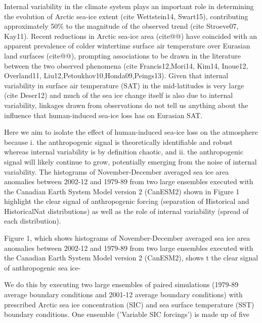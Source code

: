 \documentclass[grl]{AGUTeX}  %
\begin{document}
\begin{article}

%
%



Internal variability in the climate system plays an important role in determining the evolution of Arctic sea-ice extent (cite Wettstein14, Swart15), contributing approximately 50\% to the magnitude of the observed trend (cite Stroeve07, Kay11). Recent reductions in Arctic sea-ice area (cite@@) have coincided with an apparent prevalence of colder wintertime surface air temperature over Eurasian land surfaces (cite@@), prompting associations to be drawn in the literature between the two observed phenomena (cite Francis12,Mori14, Kim14, Inoue12, Overland11, Liu12,Petoukhov10,Honda09,Peings13). Given that internal variability in surface air temperature (SAT) in the mid-latitudes is very large (cite Deser12) and much of the sea ice change itself is also due to internal variability, linkages drawn from observations do not tell us anything about the influence that human-induced sea-ice loss has on Eurasian SAT.

Here we aim to isolate the effect of human-induced sea-ice loss on the atmosphere because i. the anthropogenic signal is theoretically identifiable and robust whereas internal variability is by definition chaotic, and ii. the anthropogenic signal will likely continue to grow, potentially emerging from the noise of internal variability. The histograms of November-December averaged sea ice area anomalies between 2002-12 and 1979-89 from two large ensembles executed with the Canadian Earth System Model version 2 (CanESM2) shown in Figure 1 highlight the clear signal of anthropogenic forcing (separation of Historical and HistoricalNat distributions) as well as the role of internal variability (spread of each distribution). 

Figure 1, which shows histograms of November-December averaged sea ice area anomalies between 2002-12 and 1979-89 from two large ensembles executed with the Canadian Earth System Model version 2 (CanESM2), shows t the clear signal of anthropogenic sea ice-

We do this by executing two large ensembles of paired simulations (1979-89 average boundary conditions and 2001-12 average boundary conditions) with prescribed Arctic sea ice concentration (SIC) and sea surface temperature (SST) boundary conditions. One ensemble ('Variable SIC forcings') is made up of five 


\end{article}
\end{document}
